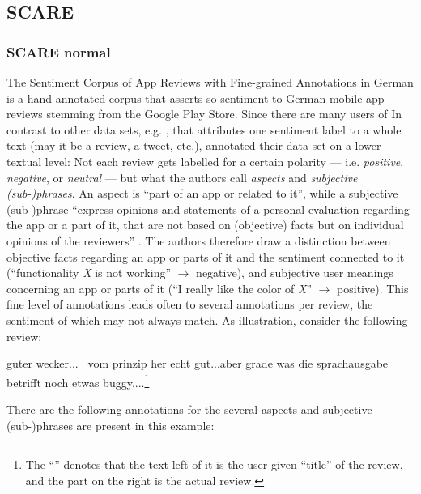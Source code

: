 \subsection{SCARE}

\subsubsection{SCARE normal}

The Sentiment Corpus of App Reviews with Fine-grained Annotations in German \cite{sanger2016scare} is a hand-annotated corpus that asserts so sentiment to German mobile app reviews stemming from the Google Play Store.
Since there are many users of 
In contrast to other data sets, e.g. \citep{socher2013recursive, go2009twitter}, that attributes one sentiment label to a whole text (may it be a review, a tweet, etc.), \cite{sanger2016scare} annotated their data set on a lower textual level:
Not each review gets labelled for a certain polarity --- i.e. \textit{positive}, \textit{negative}, or \textit{neutral} --- but what the authors call \textit{aspects} and \textit{subjective (sub-)phrases}.
An aspect is ``part of an app or related to it'', while a subjective (sub-)phrase ``express opinions and statements of a
personal evaluation regarding the app or a part of it, that are not based on (objective) facts but on individual opinions of the reviewers'' \citep[p.~1116]{sanger2016scare}.
The authors therefore draw a distinction between objective facts regarding an app or parts of it and the sentiment connected to it (``functionality \textit{X} is not working'' $\rightarrow$ negative), and subjective user meanings concerning an app or parts of it (``I really like the color of \textit{X}'' $\rightarrow$ positive).
This fine level of annotations leads often to several annotations per review, the sentiment of which may not always match.
As illustration, consider the following review:

\begin{examples}
	\label{ex:fine-grained-anno}
	\item guter wecker... \textbar\textbar\ vom prinzip her echt gut...aber grade was die sprachausgabe betrifft noch etwas buggy....\footnote{The ``\textbar\textbar'' denotes that the text left of it is the user given ``title'' of the review, and the part on the right is the actual review.}
\end{examples}

There are the following annotations for the several aspects and subjective (sub-)phrases are present in this example:

